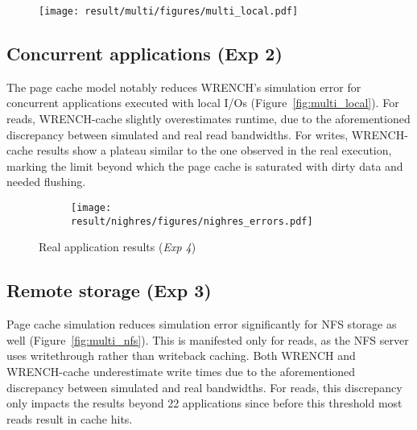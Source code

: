 \documentclass[conference]{IEEEtran}
\newcommand{\wrench}{WRENCH\xspace}
\begin{document}
            \begin{figure*}
                \begin{subfigure}{\linewidth}
                    \centering
                    \texttt{[image: result/multi/figures/multi\_local.pdf]}
                \end{subfigure}
                \caption{Concurrent results with 3~GB files (\textit{Exp 2})}
                \label{fig:multi_local}
            \end{figure*}
        \subsection{Concurrent applications (Exp 2)}


            The page cache model notably reduces \wrench's simulation error
            for concurrent applications executed with local I/Os
            (Figure~\ref{fig:multi_local}). For reads, \wrench-cache
            slightly overestimates runtime, due to the aforementioned discrepancy between
            simulated and real read bandwidths.
            For writes, \wrench-cache results show a
            plateau similar to the one observed in the real
            execution, marking the limit beyond which the page cache is
            saturated with dirty data and needed flushing.

            \begin{figure}[b]
                \begin{subfigure}{0.95\linewidth}
                    \centering
                    \texttt{[image: result/nighres/figures/nighres\_errors.pdf]}
                \end{subfigure}
                \caption{Real application results (\textit{Exp 4})}
                \label{fig:nighres}
                \end{figure}

        \subsection{Remote storage (Exp 3)}

            Page cache simulation  reduces simulation error significantly for
            NFS storage as well (Figure~\ref{fig:multi_nfs}). This
            is manifested only for reads, as the NFS server uses writethrough rather than writeback caching.
            Both \wrench and \wrench-cache
            underestimate write times due to the aforementioned discrepancy between
            simulated and real bandwidths. For reads,
            this discrepancy only impacts the results beyond 22
            applications since before this threshold most reads result in cache
            hits.
\end{document}
